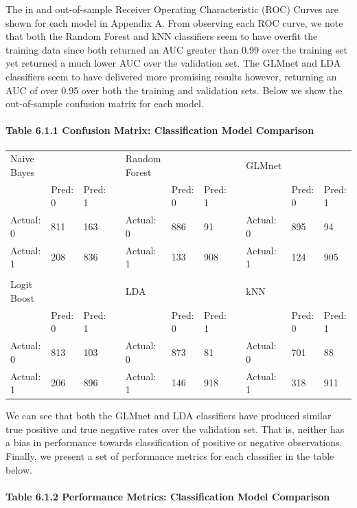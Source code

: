 \documentclass[]{article}
\let\oldparagraph\paragraph
\renewcommand{\paragraph}[1]{\oldparagraph{#1}\mbox{}}
\begin{document}
The in and out-of-sample Receiver Operating Characteristic (ROC) Curves
are shown for each model in Appendix A. From observing each ROC curve,
we note that both the Random Forest and kNN classifiers seem to have
overfit the training data since both returned an AUC greater than 0.99
over the training set yet returned a much lower AUC over the validation
set. The GLMnet and LDA classifiers seem to have delivered more
promising results however, returning an AUC of over 0.95 over both the
training and validation sets. Below we show the out-of-sample confusion
matrix for each model.

\paragraph{Table 6.1.1 Confusion Matrix: Classification Model
Comparison}\label{table-6.1.1-confusion-matrix-classification-model-comparison}

\begin{longtable}[]{@{}lllllllllll@{}}
\toprule
Naive Bayes & & & & Random Forest & & & & GLMnet & &\tabularnewline
& Pred: 0 & Pred: 1 & & & Pred: 0 & Pred: 1 & & & Pred: 0 & Pred:
1\tabularnewline
Actual: 0 & 811 & 163 & & Actual: 0 & 886 & 91 & & Actual: 0 & 895 &
94\tabularnewline
Actual: 1 & 208 & 836 & & Actual: 1 & 133 & 908 & & Actual: 1 & 124 &
905\tabularnewline
& & & & & & & & & &\tabularnewline
Logit Boost & & & & LDA & & & & kNN & &\tabularnewline
& Pred: 0 & Pred: 1 & & & Pred: 0 & Pred: 1 & & & Pred: 0 & Pred:
1\tabularnewline
Actual: 0 & 813 & 103 & & Actual: 0 & 873 & 81 & & Actual: 0 & 701 &
88\tabularnewline
Actual: 1 & 206 & 896 & & Actual: 1 & 146 & 918 & & Actual: 1 & 318 &
911\tabularnewline
\bottomrule
\end{longtable}

We can see that both the GLMnet and LDA classifiers have produced
similar true positive and true negative rates over the validation set.
That is, neither has a bias in performance towards classification of
positive or negative observations. Finally, we present a set of
performance metrics for each classifier in the table below.

\paragraph{Table 6.1.2 Performance Metrics: Classification Model
Comparison}\label{table-6.1.2-performance-metrics-classification-model-comparison}
\end{document}
